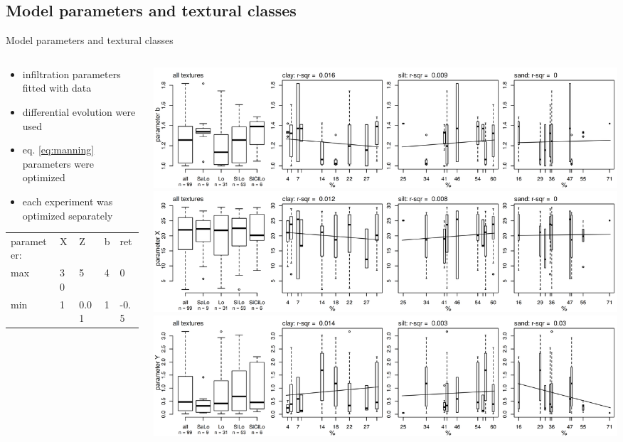 \subsection{Model parameters and textural classes}
\begin{block}{Model parameters and textural classes}
\begin{columns}
    \begin{column}{0.2\textwidth}
            \begin{itemize}
                \item infiltration parameters fitted with data
                \item differential evolution were used
                \item eq. \ref{eq:manning} parameters were optimized
                \item each experiment was optimized separately
            \end{itemize}
        \begin{table}[]
            \small
            \begin{tabular}{lllll}
            parameter: & X & Z & b & ret \\
            max & 30 & 5 & 4 & 0 \\
            min & 1 & 0.01 & 1 & -0.5 \\
            \end{tabular}
        \end{table}
    \end{column}
    \begin{column}{0.8\textwidth}
        \includegraphics[width = \textwidth]{obr/bfittex.png}\\
        \includegraphics[width = \textwidth]{obr/Xfittex.png}\\
        \includegraphics[width = \textwidth]{obr/Yfittex.png}

\end{column}
\end{columns}
\end{block}
